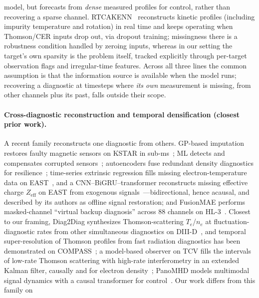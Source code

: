 \documentclass[10pt]{article}
\begin{document}
model, but forecasts from \emph{dense} measured profiles for control, rather
than recovering a sparse channel. RTCAKENN~\citep{Shousha2023MachineLearningbased}
reconstructs kinetic profiles (including impurity temperature and rotation) in
real time and keeps operating when Thomson/CER inputs drop out, via dropout
training; missingness there is a robustness condition handled by zeroing inputs,
whereas in our setting the target's own sparsity is the problem itself, tracked
explicitly through per-target observation flags and irregular-time features.
Across all three lines the common assumption is that the information source is
available when the model runs; recovering a diagnostic at timesteps where
\emph{its own} measurement is missing, from other channels plus its past, falls
outside their scope.

\paragraph{Cross-diagnostic reconstruction and temporal densification (closest prior work).}
A recent family reconstructs one diagnostic from others. GP-based imputation
restores faulty magnetic sensors on KSTAR in
sub-ms~\citep{Joung2018ImputationFaulty}; ML detects and compensates corrupted
sensors~\citep{Mohapatra2019RealtimeSensor}; autoencoders fuse redundant density
diagnostics for resilience~\citep{Kaldas2026DevelopingAutoencoder}; time-series
extrinsic regression fills missing electron-temperature data on
EAST~\citep{Wang2025TimeSeries}, and a CNN--BiGRU--transformer reconstructs missing
effective charge $Z_{\mathrm{eff}}$ on EAST from exogenous
signals~\citep{Jia2026TimeSeries}---bidirectional, hence acausal, and described by
its authors as offline signal restoration; and FusionMAE performs masked-channel ``virtual
backup diagnosis'' across 88 channels on HL-3~\citep{Yang2026FusionmaeSelfsupervised}.
Closest to our framing, Diag2Diag synthesizes Thomson-scattering $T_e$/$n_e$ at
fluctuation-diagnostic rates from other simultaneous diagnostics on
DIII-D~\citep{Jalalvand2025MultimodalSuperresolution}, and temporal
super-resolution of Thomson profiles from fast radiation diagnostics has been
demonstrated on COMPASS~\citep{Imrek2026TemporalSuperresolution}; a model-based
observer on TCV fills the intervals of low-rate Thomson scattering with high-rate
interferometry in an extended Kalman filter, causally and for electron
density~\citep{Pastore2023ModelBased}; PanoMHD models
multimodal signal dynamics with a causal transformer for
control~\citep{Noh2026PanomhdMultimodal}. Our work differs from this family on
\end{document}
